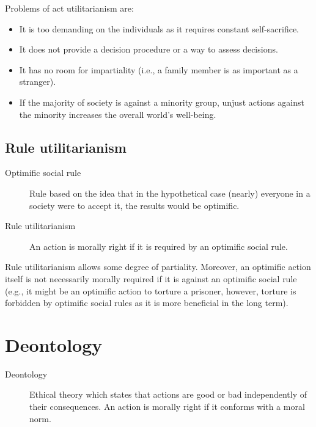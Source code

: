 \begin{remark}
    Problems of act utilitarianism are:
    \begin{itemize}
        \item It is too demanding on the individuals as it requires constant self-sacrifice.
        \item It does not provide a decision procedure or a way to assess decisions.
        \item It has no room for impartiality (i.e., a family member is as important as a stranger).
        \item If the majority of society is against a minority group, unjust actions against the minority increases the overall world's well-being.
    \end{itemize}
\end{remark}


\subsection{Rule utilitarianism}

\begin{description}
    \item[Optimific social rule] 
        Rule based on the idea that in the hypothetical case (nearly) everyone in a society were to accept it, the results would be optimific. 

    \item[Rule utilitarianism] 
        An action is morally right if it is required by an optimific social rule.

\end{description}

\begin{remark}
    Rule utilitarianism allows some degree of partiality. Moreover, an optimific action itself is not necessarily morally required if it is against an optimific social rule (e.g., it might be an optimific action to torture a prisoner, however, torture is forbidden by optimific social rules as it is more beneficial in the long term).
\end{remark}



\section{Deontology}

\begin{description}
    \item[Deontology] 
        Ethical theory which states that actions are good or bad independently of their consequences. An action is morally right if it conforms with a moral norm.
\end{description}


